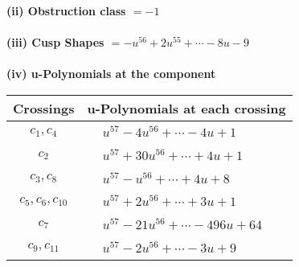 \documentclass[1p]{elsarticle_modified}
\theoremstyle{definition}
\begin{document}
\flushleft \textbf{(ii) Obstruction class $= -1$}\\~\\
\flushleft \textbf{(iii) Cusp Shapes $= - u^{56}+2 u^{55}+\cdots-8 u-9$}\\~\\
\newpage\renewcommand{\arraystretch}{1}
\flushleft \textbf{(iv) u-Polynomials at the component}\newline \\
\begin{tabular}{m{50pt}|m{274pt}}
Crossings & \hspace{64pt}u-Polynomials at each crossing \\
\hline $$\begin{aligned}c_{1},c_{4}\end{aligned}$$&$\begin{aligned}
&u^{57}-4 u^{56}+\cdots-4 u+1
\end{aligned}$\\
\hline $$\begin{aligned}c_{2}\end{aligned}$$&$\begin{aligned}
&u^{57}+30 u^{56}+\cdots+4 u+1
\end{aligned}$\\
\hline $$\begin{aligned}c_{3},c_{8}\end{aligned}$$&$\begin{aligned}
&u^{57}- u^{56}+\cdots+4 u+8
\end{aligned}$\\
\hline $$\begin{aligned}c_{5},c_{6},c_{10}\end{aligned}$$&$\begin{aligned}
&u^{57}+2 u^{56}+\cdots+3 u+1
\end{aligned}$\\
\hline $$\begin{aligned}c_{7}\end{aligned}$$&$\begin{aligned}
&u^{57}-21 u^{56}+\cdots-496 u+64
\end{aligned}$\\
\hline $$\begin{aligned}c_{9},c_{11}\end{aligned}$$&$\begin{aligned}
&u^{57}-2 u^{56}+\cdots-3 u+9
\end{aligned}$\\
\hline
\end{tabular}\\~\\
\end{document}
